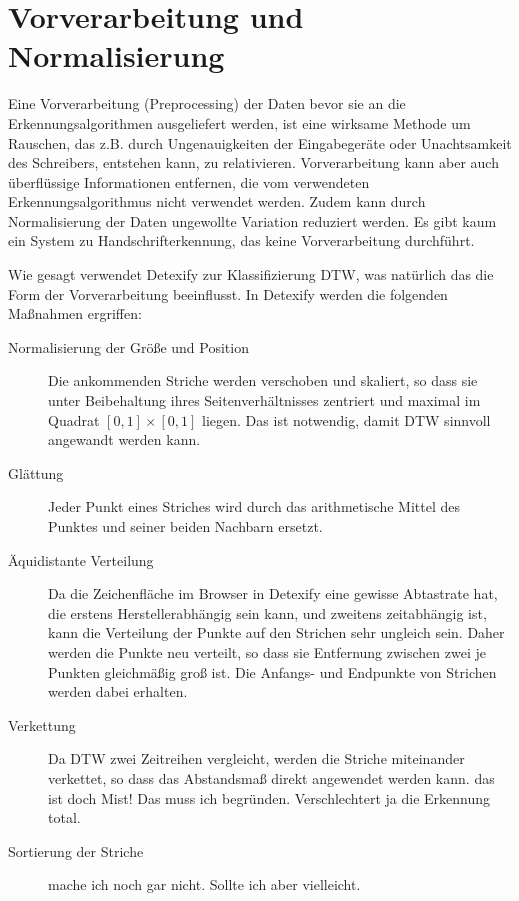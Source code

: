 \section{Vorverarbeitung und Normalisierung} %
\label{sec:vorverarbeitung}

Eine Vorverarbeitung (Preprocessing) der Daten bevor sie an die Erkennungsalgorithmen ausgeliefert werden, ist eine wirksame Methode um Rauschen, das z.B. durch Ungenauigkeiten der Eingabegeräte oder Unachtsamkeit des Schreibers, entstehen kann, zu relativieren. Vorverarbeitung kann aber auch überflüssige Informationen entfernen, die vom verwendeten Erkennungsalgorithmus nicht verwendet werden. Zudem kann durch Normalisierung der Daten ungewollte Variation reduziert werden. Es gibt kaum ein System zu Handschrifterkennung, das keine Vorverarbeitung durchführt.

Wie gesagt verwendet Detexify zur Klassifizierung \ac{DTW}, was natürlich das die Form der Vorverarbeitung beeinflusst. In Detexify werden die folgenden Maßnahmen ergriffen:

\begin{description}
  \item[Normalisierung der Größe und Position]
    Die ankommenden Striche werden verschoben und skaliert, so dass sie unter Beibehaltung ihres Seitenverhältnisses zentriert und maximal im Quadrat $[0,1]\times[0,1]$ liegen. Das ist notwendig, damit \ac{DTW} sinnvoll angewandt werden kann.
  \item[Glättung]
    Jeder Punkt eines Striches wird durch das arithmetische Mittel des Punktes und seiner beiden Nachbarn ersetzt.
  \item[Äquidistante Verteilung]
    Da die Zeichenfläche im Browser in Detexify eine gewisse Abtastrate hat, die erstens Herstellerabhängig sein kann, und zweitens zeitabhängig ist, kann die Verteilung der Punkte auf den Strichen sehr ungleich sein. Daher werden die Punkte neu verteilt, so dass sie Entfernung zwischen zwei je Punkten gleichmäßig groß ist. Die Anfangs- und Endpunkte von Strichen werden dabei erhalten.
  \item[Verkettung]
    Da \ac{DTW} zwei Zeitreihen vergleicht, werden die Striche miteinander verkettet, so dass das Abstandsmaß direkt angewendet werden kann. \TODO das ist doch Mist! Das muss ich begründen. Verschlechtert ja die Erkennung total.
  \item[Sortierung der Striche]
    \TODO mache ich noch gar nicht. Sollte ich aber vielleicht.
\end{description}

